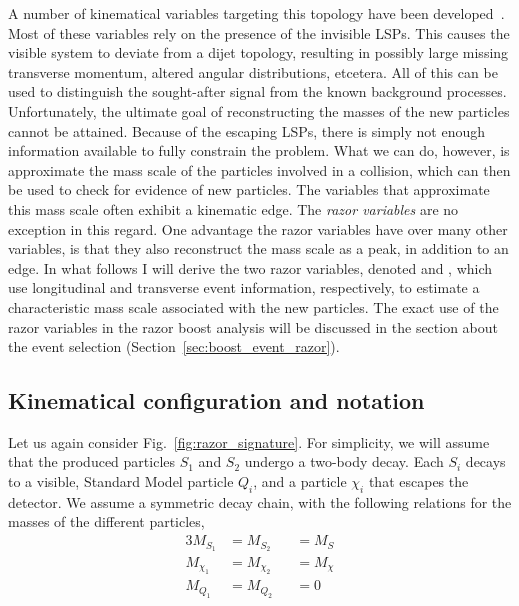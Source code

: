 A number of kinematical variables targeting this topology have been
developed~\cite{Lester:1999tx,Barr:2003rg,Randall:2008rw,Polesello:2009rn,Bai:2012gs}.
Most of these variables rely on the presence of the invisible LSPs. This causes the visible system
to deviate from a dijet topology, resulting in possibly large missing transverse momentum, altered
angular distributions, etcetera. All of this can be used to distinguish the sought-after signal
from the known background processes. 
Unfortunately, the ultimate goal of reconstructing the masses of the new particles cannot be
attained. Because of the escaping LSPs, there is simply not enough information available to fully
constrain the problem. What we can do, however, is approximate the mass scale of the particles
involved in a collision, which can then be used to check for evidence of new particles. 
The variables that approximate this mass scale often exhibit a kinematic edge. 
The \textit{razor variables} \cite{rogan,Rogan:1557072,Chatrchyan:2011ek,Chatrchyan:2014goa} are no
exception in this regard. One advantage the razor variables have over many other variables, is that
they also reconstruct the mass scale as a peak, in addition to an edge. 
In what follows I will derive the two razor variables, denoted \mr and \rsq, which use longitudinal
and transverse event information, respectively, to estimate a characteristic mass scale associated
with the new particles. 
The exact use of the razor variables in the razor boost analysis will be discussed in
the section about the event selection (Section~\ref{sec:boost_event_razor}). 


\subsection{Kinematical configuration and notation \label{sec:razor_notation}}

Let us again consider Fig.~\ref{fig:razor_signature}. For simplicity, we will assume that the
produced particles $S_1$ and $S_2$ undergo a two-body decay. Each $S_i$ decays to a visible,
Standard Model particle $Q_i$, and a particle $\chi_i$ that escapes the detector. 
We assume a symmetric decay chain, with the following relations for the masses of the different
particles,
\begin{alignat}{3}
  M_{S_1} &= M_{S_2} &&= M_S \label{eq:equal_S_masses}\\
  M_{\chi_1} &= M_{\chi_2} &&= M_{\chi} \label{eq:equal_chi_masses}\\
  M_{Q_1} &= M_{Q_2} &&= 0 \label{eq:no_Q_masses}
\end{alignat}

